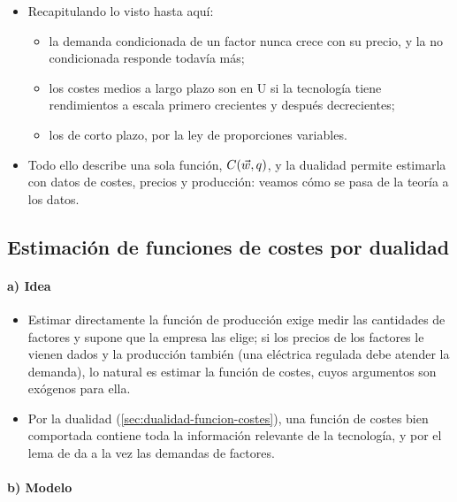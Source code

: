 \documentclass[11pt]{article}
\begin{document}
\begin{itemize}
\item Recapitulando lo visto hasta aquí:
  \begin{itemize}
  \item la demanda condicionada de un factor nunca crece con su precio, y la no condicionada responde todavía más;
  \item los costes medios a largo plazo son en U si la tecnología tiene rendimientos a escala primero crecientes y después decrecientes;
  \item los de corto plazo, por la ley de proporciones variables.
  \end{itemize}
\item Todo ello describe una sola función, $C(\vec{w},q)$, y la dualidad permite estimarla con datos de costes, precios y producción: veamos cómo se pasa de la teoría a los datos.
\end{itemize}

\subsection{Estimación de funciones de costes por dualidad}\label{sec:estimacion-funciones-costes}

\paragraph{a) Idea}

\begin{itemize}
\item Estimar directamente la función de producción exige medir las cantidades de factores y supone que la empresa las elige; si los precios de los factores le vienen dados y la producción también (una eléctrica regulada debe atender la demanda), lo natural es estimar la función de costes, cuyos argumentos son exógenos para ella\nocite{Nerlove1963Returns}.
\item Por la dualidad (\ref{sec:dualidad-funcion-costes}), una función de costes bien comportada contiene toda la información relevante de la tecnología, y por el lema de  da a la vez las demandas de factores.
\end{itemize}

\paragraph{b) Modelo}
\end{document}
